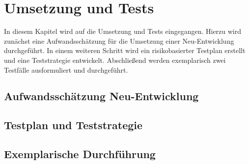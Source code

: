 \section{Umsetzung und Tests}
In diesem Kapitel wird auf die Umsetzung und Tests eingegangen.
Hierzu wird zunächst eine Aufwandsschätzung für die Umsetzung einer Neu-Entwicklung durchgeführt.
In einem weiteren Schritt wird ein risikobasierter Testplan erstellt und eine Teststrategie entwickelt.
Abschließend werden exemplarisch zwei Testfälle ausformuliert und durchgeführt.

\subsection{Aufwandsschätzung Neu-Entwicklung}

\subsection{Testplan und Teststrategie}


\subsection{Exemplarische Durchführung}